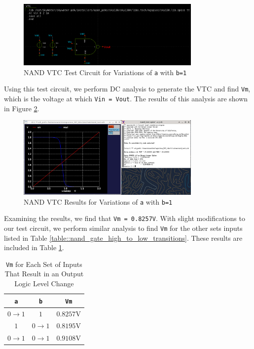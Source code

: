 \documentclass[fleqn]{article}
\begin{document}
	\begin{figure}[H]
		\centerline{\includegraphics[width=0.8\textwidth]{nand_vtc_test_sweep_va.png}}
		\caption{NAND VTC Test Circuit for Variations of \texttt{a} with \texttt{b=1}}
		\label{fig::nand_vtc_test_sweep_va}
	\end{figure}	
	
	\noindent Using this test circuit, we perform DC analysis to generate the VTC and find \texttt{Vm}, which is the voltage at which \texttt{Vin = Vout}. The results of this analysis are shown in Figure \ref{fig::nand_vtc_sweep_va}.
	
	\begin{figure}[H]
		\centerline{\includegraphics[width=0.8\textwidth]{nand_vtc_sweep_va.png}}
		\caption{NAND VTC Results for Variations of \texttt{a} with \texttt{b=1}}
		\label{fig::nand_vtc_sweep_va}
	\end{figure}
	
	Examining the results, we find that \texttt{Vm = 0.8257V}. With slight modifications to our test circuit, we perform similar analysis to find \texttt{Vm} for the other sets inputs listed in Table \ref{table::nand_gate_high_to_low_transitions}. These results are included in Table \ref{table::nand_gate_vm}.
	
	\begin{table}[H]
	\begin{center}
	\caption{\texttt{Vm} for Each Set of Inputs That Result in an Output Logic Level Change}
	\label{table::nand_gate_vm}
	\begin{tabular}{| c | c | c |}
		\hline
		\texttt{a} & \texttt{b} & \texttt{Vm}\\
		\hline	
		$0 \rightarrow 1$ & $1$ & $0.8257 \text{V}$\\
		\hline	
		$1$ & $0 \rightarrow 1$ & $0.8195 \text{V}$\\
		\hline	
		$0 \rightarrow 1$ & $0 \rightarrow 1$ & $0.9108 \text{V}$\\
		\hline
	\end{tabular}
	\end{center}
	\end{table}
	
\end{document}
